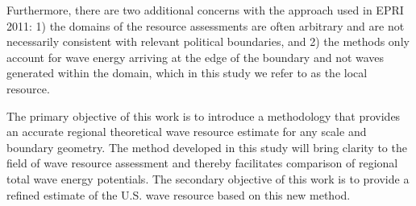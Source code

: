 Furthermore, there are two additional concerns with the approach used in EPRI 2011: 1) the domains of the resource assessments are often arbitrary and are not necessarily consistent with relevant political boundaries, and 2) the methods only account for wave energy arriving at the edge of the boundary and not waves generated within the domain, which in this study we refer to as the local resource.

The primary objective of this work is to introduce a methodology that provides an accurate regional theoretical wave resource estimate for any scale and boundary geometry. The method developed in this study will bring clarity to the field of wave resource assessment and thereby facilitates comparison of regional total wave energy potentials. The secondary objective of this work is to provide a refined estimate of the U.S. wave resource based on this new method.
